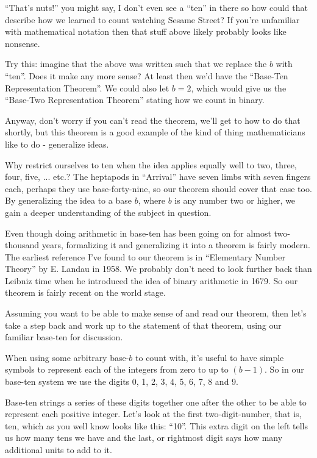 \documentclass{article}
\begin{document}
``That's nuts!'' you might say, I don't even see a ``ten'' in there so how could that
describe how we learned to count watching Sesame Street? 
If you're unfamiliar with mathematical notation then that stuff above likely probably looks
like nonsense.

Try this: imagine that the above was 
written such that
we replace the $b$ with ``ten''. Does it make any more sense?
At least then we'd have the ``Base-Ten Representation Theorem''. We could also let $b=2$,
which would give us the 
``Base-Two Representation Theorem'' stating how we count in binary.

Anyway, don't worry if you can't read the theorem, we'll get to how to do that shortly, but
this theorem is a good example of the kind of thing mathematicians like to do - generalize ideas.

Why restrict ourselves to ten when the idea applies equally well to two, three, four, five, ... etc.?
The heptapods in ``Arrival'' have  seven limbs with seven fingers each, perhaps they
use base-forty-nine, so our
theorem should cover that case too.  By generalizing the idea to a base $b$, where $b$ is any number two or higher,
we gain a deeper understanding of the subject in question.

Even though doing arithmetic in base-ten
has been going on for almost two-thousand
years, formalizing it and generalizing it into a theorem is fairly modern.
The earliest reference I've found to our theorem
is in ``Elementary Number Theory'' by E. Landau in 1958.
We probably don't need to look further back than
Leibniz time when he introduced the idea of binary
arithmetic in 1679. So our theorem is fairly recent 
on the world stage.


Assuming you want to be able to make sense of and read our theorem, then let's take a step
back and work up to the statement of that theorem, using
our familiar base-ten for discussion.

When using some arbitrary base-$b$ to count with,
it's useful to have simple symbols to represent each of the integers from zero to up to $(b-1)$.
So in our base-ten system we use the
digits 0, 1, 2, 3, 4, 5, 6, 7, 8 and 9.

Base-ten strings a series of these digits together
one after the other to be able to represent each positive integer.
Let's look at the first two-digit-number, that is, ten,
which as you well know looks like this: ``10''.
This extra digit on the left tells us how many tens we have and the last,
or rightmost digit says how many additional units to add to it.
\end{document}
